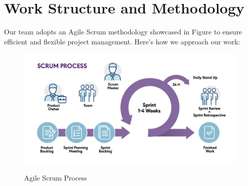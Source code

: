 \section{Work Structure and Methodology}

Our team adopts an Agile Scrum methodology showcased in Figure  to ensure 
efficient and flexible project management. Here’s how we approach our work:

\begin{figure}[H]
    \begin{center}
       \includegraphics[width=6in]{images/Chap0/blog-scrum-process-opt.jpg}\\
       \caption{Agile Scrum Process \cite{R6}}
       \label{Agile Scrum Process}
       \end{center}
\end{figure}

